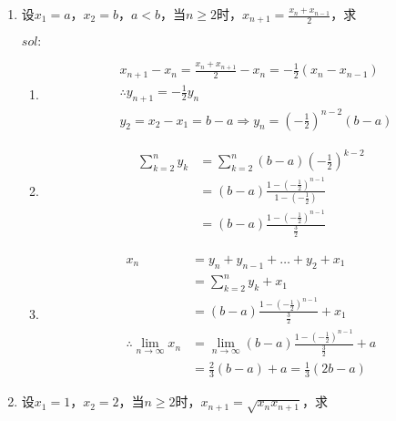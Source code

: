 \begin{enumerate}[{例}1.]
    \item 设$x_1=a$，$x_2=b$，$a<b$，当$n\geq 2$时，$x_{n+1}=\frac{x_n +x_{n-1}}{2}$，求
        $sol:$
        \begin{enumerate}[(1)]
            \item 
                \begin{align*}
                    &x_{n+1}-x_n=\frac{x_n+x_{n+1}}{2}-x_n=-\frac{1}{2}(x_n-x_{n-1})\\
                    &\therefore y_{n+1}=-\frac{1}{2}y_n\\
                    &y_2=x_2-x_1=b-a\Rightarrow y_n=(-\frac{1}{2})^{n-2}(b-a)
                \end{align*}
            \item
                \begin{align*}
                    \sum_{k=2}^n y_k&=\sum_{k=2}^n(b-a)(-\frac{1}{2})^{k-2}\\
                    &=(b-a)\frac{1-(-\frac{1}{2})^{n-1}}{1-(-\frac{1}{2})}\\
                    &=(b-a)\frac{1-(-\frac{1}{2})^{n-1}}{\frac{3}{2}}
                \end{align*}
            \item
                \begin{align*}
                    x_n&=y_n+y_{n-1}+\dots+y_2+x_1\\
                    &=\sum_{k=2}^ny_k+x_1\\
                    &=(b-a)\frac{1-(-\frac{1}{2})^{n-1}}{\frac{3}{2}}+x_1\\
                    \therefore\lim_{n\to\infty}x_n&=\lim_{n\to\infty}(b-a)\frac{1-(-\frac{1}{2})^{n-1}}{\frac{3}{2}}+a\\
                    &=\frac{2}{3}(b-a)+a=\frac{1}{3}(2b-a)
                \end{align*}
        \end{enumerate}
    \item 设$x_1=1$，$x_2=2$，当$n\geq 2$时，$x_{n+1}=\sqrt{x_n x_{n+1}}$，求
        \begin{compactenum}[(1)]

\end{compactenum}
\end{enumerate}
